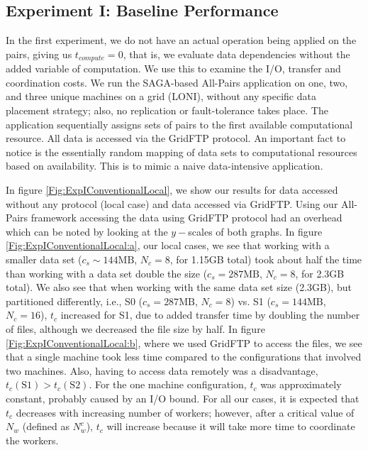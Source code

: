 \documentclass{rspublic}
\begin{document}
\vspace{-0.3cm}

\subsection{Experiment I: Baseline Performance}\label{Sec:gridFTPExp}
In the first experiment, we do not have an actual operation being
applied on the pairs, giving us $t_{compute}=0$, that is, we evaluate
data dependencies without the added variable of computation. We use
this to examine the I/O, transfer and coordination costs. We run the
SAGA-based All-Pairs application on one, two, and three unique
machines on a grid (LONI), without any specific data placement
strategy; also, no replication or fault-tolerance takes place. The
application sequentially assigns sets of pairs to the first available
computational resource. All data is accessed via the GridFTP
protocol. An important fact to notice is the essentially random
mapping of data sets to computational resources based on
availability. This is to mimic a naive data-intensive application.

In figure \ref{Fig:ExpIConventionalLocal}, we show our results for
data accessed without any protocol (local case) and data accessed via
GridFTP. Using our All-Pairs framework accessing the data using
GridFTP protocol had an overhead which can be noted by looking at the
$y-$scales of both graphs. In figure
\ref{Fig:ExpIConventionalLocal:a}, our local cases, we see that
working with a smaller data set ($c_s \sim 144\mbox{MB}$, $N_c = 8$, for 1.15GB
total) took about half the time than working with a data set double
the size ($c_s = 287\mbox{MB}$, $N_c = 8$, for 2.3GB total). We also see that
when working with the same data set size (2.3GB), but partitioned
differently, i.e., S0 ($c_s = 287\mbox{MB}$, $N_c = 8$) vs. S1 ($c_s =
144\mbox{MB}$, $N_c = 16$), $t_c$ increased for S1, due to added transfer
time by doubling the number of files, although we decreased the file
size by half. In figure \ref{Fig:ExpIConventionalLocal:b}, where we
used GridFTP to access the files, we see that a single machine took
less time compared to the configurations that involved two
machines. Also, having to access data remotely was a disadvantage,
$t_c(\mbox{S1}) > t_c(\mbox{S2})$. For the one machine configuration,
$t_c$ was approximately constant, probably caused by an I/O bound. For
all our cases, it is expected that $t_c$ decreases with increasing
number of workers; however, after a critical value of $N_w$ (defined
as $N^c_w$), $t_c$ will increase because it will take more time to
coordinate the workers.
\end{document}
